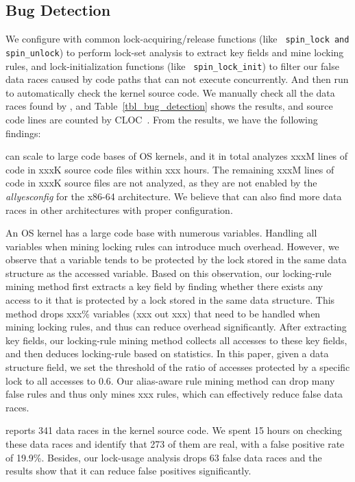 \subsection{Bug Detection}
\label{subsec_bug_detection}

We configure \sys with common lock-acquiring/release functions (like {\tt 
spin\_lock and spin\_unlock}) to perform lock-set analysis to extract key 
fields and mine locking rules, and lock-initialization functions (like {\tt 
spin\_lock\_init}) to filter our false data races caused by code paths that 
can not execute concurrently. And then run \sys to automatically check the 
kernel source code. We manually check all the data races found by \sys, and 
Table~\ref{tbl_bug_detection} shows the results, and source code lines are 
counted by CLOC~\cite{cloc}. From the results, we have the following findings:

 \sys can scale to large code bases of OS kernels, and it in 
total analyzes xxxM lines of code in xxxK source code files within xxx hours. 
The remaining xxxM lines of code in xxxK source files are not analyzed, as they 
are not enabled by the {\em allyesconfig} for the x86-64 architecture. We 
believe that \sys can also find more data races in other architectures with 
proper configuration.

 An OS kernel has a large code base with numerous 
variables. Handling all variables when mining locking rules can introduce much 
overhead. However, we observe that a variable tends to be protected by the lock 
stored in the same data structure as the accessed variable. Based on this 
observation, our locking-rule mining method first extracts a key field by 
finding whether there exists any access to it that is protected by a lock 
stored in the same data structure. This method drops xxx\% variables (xxx out 
xxx) that need to be handled when mining locking rules, and thus can reduce 
overhead significantly. After extracting key fields, our locking-rule mining 
method collects all accesses to these key fields, and then deduces locking-rule 
based on statistics. In this paper, given a data structure field, we set the 
threshold of the ratio of accesses protected by a specific lock to all accesses 
to 0.6. Our alias-aware rule mining method can drop many false rules and thus 
only mines xxx rules, which can effectively reduce false data races.

 \sys reports 341 data races in the kernel source 
code. We spent 15 hours on checking these data races and identify that 273 of 
them are real, with a false positive rate of 19.9\%. Besides, our lock-usage 
analysis drops 63 false data races and the results show that it can reduce 
false positives significantly.

